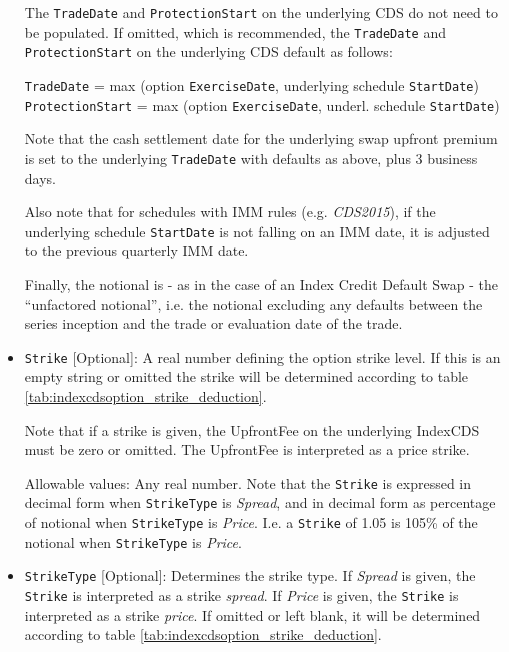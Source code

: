 \begin{itemize}
The \lstinline!TradeDate! and \lstinline!ProtectionStart! on the underlying CDS do not need to be populated. If omitted, which is recommended, the \lstinline!TradeDate! and \lstinline!ProtectionStart! on the underlying CDS default as follows:

 \lstinline!TradeDate! = max (option \lstinline!ExerciseDate!, underlying schedule \lstinline!StartDate!) \\
 \lstinline!ProtectionStart! = max (option \lstinline!ExerciseDate!, underl. schedule \lstinline!StartDate!)

Note that the  cash settlement date for the underlying swap upfront premium is set to the underlying \lstinline!TradeDate! with defaults as above, plus 3 business days. 

Also note that for schedules with IMM rules (e.g. \emph{CDS2015}), if the underlying schedule \lstinline!StartDate! is not falling on an IMM date, it is adjusted to the previous quarterly IMM date.

Finally, the notional is - as in the case of an Index Credit Default Swap - the ``unfactored notional'', i.e. the notional excluding any defaults between the series inception and the trade or evaluation date of the trade.

\item
\lstinline!Strike! [Optional]: A real number defining the option strike level. If this is an empty string or omitted the strike will be determined according to table \ref{tab:indexcdsoption_strike_deduction}. 

Note that if a strike is given, the UpfrontFee on the underlying IndexCDS must be zero or omitted. The UpfrontFee is interpreted as a price strike.

Allowable values: Any real number. Note that the \lstinline!Strike! is expressed in decimal form when \lstinline!StrikeType! is \emph{Spread}, and  in decimal form as percentage of notional when \lstinline!StrikeType! is \emph{Price}. I.e. a  \lstinline!Strike! of 1.05 is 105\% of the notional when \lstinline!StrikeType! is \emph{Price}.

\item
\lstinline!StrikeType! [Optional]: Determines the strike type. If \emph{Spread} is given, the \lstinline!Strike! is interpreted as a strike \emph{spread}. If \emph{Price} is given, the \lstinline!Strike! is interpreted as a strike \emph{price}. If omitted or left blank, it will be determined according to table \ref{tab:indexcdsoption_strike_deduction}. 


\end{itemize}

